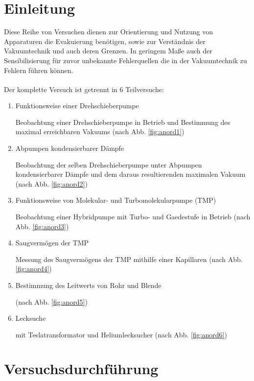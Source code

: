 \documentclass[12pt, a4paper]{scrartcl}
\begin{document}
	\section{Einleitung}
		Diese Reihe von Versuchen dienen zur Orientierung und Nutzung von Apparaturen die Evakuierung benötigen, sowie zur Verständnis der Vakuumtechnik und auch deren Grenzen. In geringem Maße auch der Sensibilisierung für zuvor unbekannte Fehlerquellen die in der Vakuumtechnik zu Fehlern führen können.\\\\
		Der komplette Versuch ist getrennt in 6 Teilversuche: \cite{skript}
		\begin{enumerate}
			\item Funktionsweise einer Drehschieberpumpe
			
				Beobachtung einer Drehschieberpumpe in Betrieb und Bestimmung des maximal erreichbaren Vakuums (nach Abb. \ref{fig:anord1})

			\item Abpumpen kondensierbarer Dämpfe
				
				Beobachtung der selben Drehschieberpumpe unter Abpumpen kondensierbarer Dämpfe und dem daraus resultierenden maximalen Vakuum (nach Abb. \ref{fig:anord2})

			\item Funktionsweise von Molekular- und Turbomolekularpumpe (TMP)
			
                Beobachtung einer Hybridpumpe mit Turbo- und Gaedestufe in Betrieb
                (nach Abb. \ref{fig:anord3})
			
			\item Saugvermögen der TMP
			
            	Messung des Saugvermögens der TMP mithilfe einer Kapillaren
                (nach Abb. \ref{fig:anord4})
			
			\item Bestimmung des Leitwerts von Rohr und Blende
            	
                (nach Abb. \ref{fig:anord5})
			
			\item Lecksuche
			
            	mit Teslatransformator und Heliumlecksucher
                (nach Abb. \ref{fig:anord6})
		\end{enumerate}
	\newpage
	\section{Versuchsdurchführung}
\end{document}
